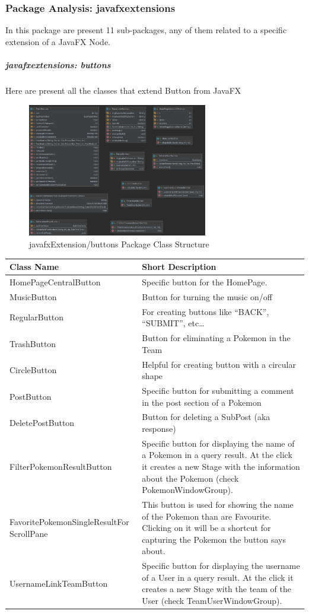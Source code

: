 \subsubsection{Package Analysis: javafxextensions}
In this package are present 11 sub-packages, any of them related to a specific extension of a JavaFX Node.
\subparagraph{javafxextensions: buttons}
Here are present all the classes that extend Button from JavaFX
\begin{figure}[H]
	\centering
	\includegraphics[width=0.7\textwidth]{img/javafx_buttons_package.png}
	\caption{javafxExtension/buttons Package Class Structure}
\end{figure}
\begin{center}
	\begin{longtable}{| m{14em} | m{19em} |} 
		\hline
		\textbf{Class Name} & \textbf{Short Description} \\ [0.5ex] 
		\hline
		HomePageCentralButton & Specific button for the HomePage.\\ 
		\hline
		MusicButton & Button for turning the music on/off\\ 
		\hline
		RegularButton & For creating buttons like “BACK”, “SUBMIT”, etc…\\ 
		\hline
		TrashButton & Button for eliminating a Pokemon in the Team\\ 
		\hline
		CircleButton & Helpful for creating button with a circular shape\\ 
		\hline
		PostButton & Specific button for submitting a comment in the post section of a Pokemon\\
		\hline
		DeletePostButton & Button for deleting a SubPost (aka response)\\
		\hline
		FilterPokemonResultButton & Specific button for displaying the name of a Pokemon in a query result. At the click it creates a new Stage with the information about the Pokemon (check PokemonWindowGroup).\\
		\hline
		FavoritePokemonSingleResultFor ScrollPane & This button is used for showing the name of the Pokemon than are Favourite. Clicking on it will be a shortcut for capturing the Pokemon the button says about.\\
		\hline
		UsernameLinkTeamButton & Specific button for displaying the username of a User in a query result. At the click it creates a new Stage with the team of the User (check TeamUserWindowGroup).\\
		\hline
	\end{longtable}
\end{center}

